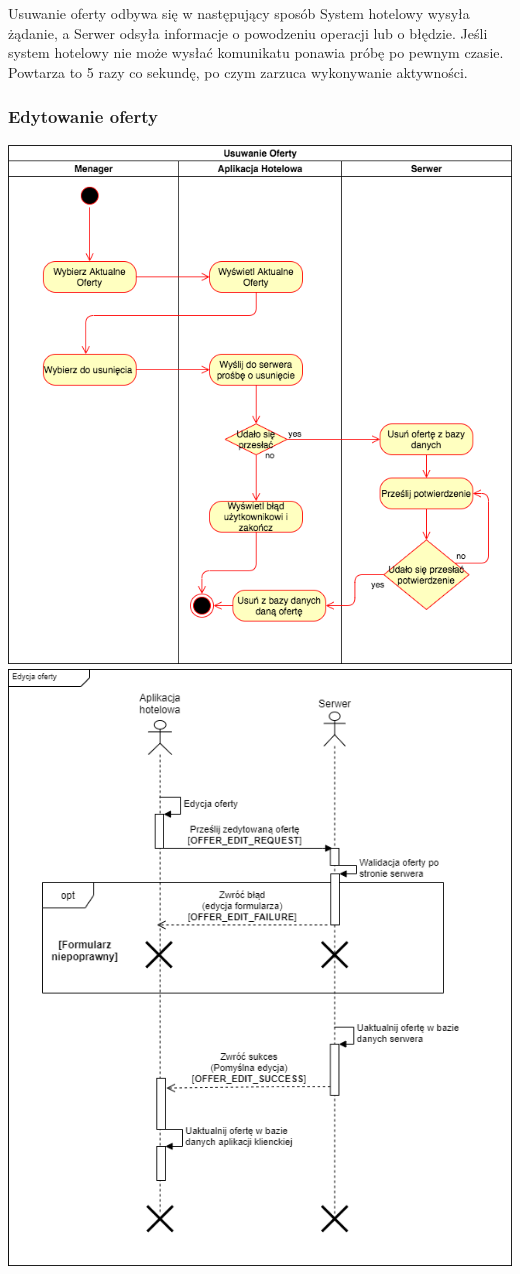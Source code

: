 \documentclass{article}
\begin{document}
Usuwanie oferty odbywa się w następujący sposób System hotelowy wysyła żądanie, a Serwer odsyła informacje o powodzeniu operacji lub o błędzie.
Jeśli system hotelowy nie może wysłać komunikatu ponawia próbę po pewnym czasie. Powtarza to 5 razy co sekundę, po czym zarzuca wykonywanie aktywności.
\subsubsection{Edytowanie oferty}
\begin{center}
    \includegraphics[scale=0.4]{Aktywnosc/IO_Aktywności-Usuwanie oferty.png}
    \includegraphics[scale=0.4]{Sekwencje/Offer_Edit.png}

\end{center}
\end{document}
